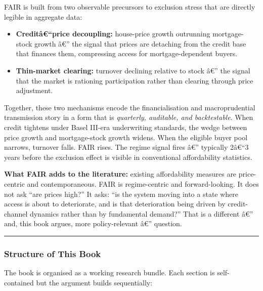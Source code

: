 FAIR is built from two observable precursors to exclusion stress that
are directly legible in aggregate data:

\begin{itemize}
\tightlist
\item
  \textbf{Creditâ€``price decoupling:} house-price growth outrunning
  mortgage-stock growth â€'' the signal that prices are detaching from
  the credit base that finances them, compressing access for
  mortgage-dependent buyers.
\item
  \textbf{Thin-market clearing:} turnover declining relative to stock
  â€'' the signal that the market is rationing participation rather than
  clearing through price adjustment.
\end{itemize}

Together, these two mechanisms encode the financialisation and
macroprudential transmission story in a form that is \emph{quarterly,
auditable, and backtestable}. When credit tightens under Basel III-era
underwriting standards, the wedge between price growth and
mortgage-stock growth widens. When the eligible buyer pool narrows,
turnover falls. FAIR rises. The regime signal fires â€'' typically
2â€``3 years before the exclusion effect is visible in conventional
affordability statistics.

\textbf{What FAIR adds to the literature:} existing affordability
measures are price-centric and contemporaneous. FAIR is regime-centric
and forward-looking. It does not ask ``are prices high?'' It asks: ``is
the system moving into a state where access is about to deteriorate, and
is that deterioration being driven by credit-channel dynamics rather
than by fundamental demand?'' That is a different â€'' and, this book
argues, more policy-relevant â€'' question.

\begin{center}\rule{0.5\linewidth}{0.5pt}\end{center}

\subsubsection{Structure of This Book}\label{structure-of-this-book}

The book is organised as a working research bundle. Each section is
self-contained but the argument builds sequentially:

